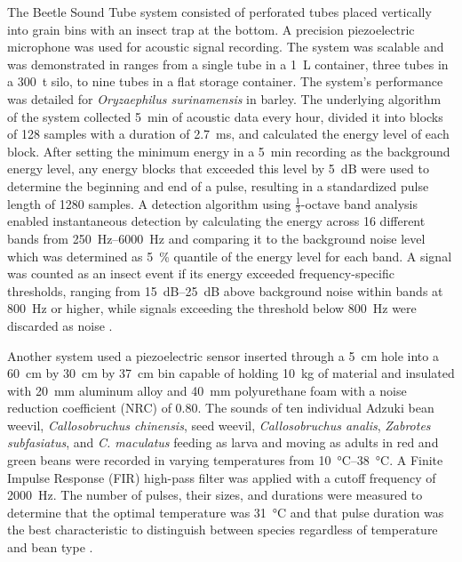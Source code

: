 \documentclass[../Vibro-Acoustic Signatures and Detection Algorithms for Stored Product Insects.tex]{subfiles}
\begin{document}
\newpage
The Beetle Sound Tube system consisted of perforated tubes placed vertically into grain bins with an insect trap at the bottom. A precision piezoelectric microphone was used for acoustic signal recording. The system was scalable and was demonstrated in ranges from a single tube in a \SI{1}{\liter} container, three tubes in a \SI{300}{\tonne} silo, to nine tubes in a flat storage container. The system's performance was detailed for \textit{Oryzaephilus surinamensis} in barley. The underlying algorithm of the system collected \SI{5}{\minute} of acoustic data every hour, divided it into blocks of 128 samples with a duration of \SI{2.7}{\milli\second}, and calculated the energy level of each block. After setting the minimum energy in a \SI{5}{\minute} recording as the background energy level, any energy blocks that exceeded this level by \SI{5}{\deci\bel} were used to determine the beginning and end of a pulse, resulting in a standardized pulse length of 1280 samples. A detection algorithm using $\frac{1}{3}$-octave band analysis enabled instantaneous detection by calculating the energy across 16 different bands from \SIrange{250}{6000}{\hertz} and comparing it to the background noise level which was determined as \SI{5}{\percent} quantile of the energy level for each band. A signal was counted as an insect event if its energy exceeded frequency-specific thresholds, ranging from \SIrange{15}{25}{\deci\bel} above background noise within bands at \SI{800}{\hertz} or higher, while signals exceeding the threshold below \SI{800}{\hertz} were discarded as noise \cite{muller-blenkleMethodAcousticStorage2023}.

Another system used a piezoelectric sensor inserted through a \SI{5}{\centi\meter} hole into a \SI{60}{\centi\meter} by \SI{30}{\centi\meter} by \SI{37}{\centi\meter} bin capable of holding \SI{10}{\kilo\gram} of material and insulated with \SI{20}{\milli\meter} aluminum alloy and \SI{40}{\milli\meter} polyurethane foam with a noise reduction coefficient (NRC) of 0.80. The sounds of ten individual Adzuki bean weevil, \textit{Callosobruchus chinensis}, seed weevil, \textit{Callosobruchus analis}, \textit{Zabrotes subfasiatus}, and \textit{C. maculatus} feeding as larva and moving as adults in red and green beans were recorded in varying temperatures from \SIrange{10}{38}{\celsius}. A Finite Impulse Response (FIR) high-pass filter was applied with a cutoff frequency of \SI{2000}{\hertz}. The number of pulses, their sizes, and durations were measured to determine that the optimal temperature was \SI{31}{\celsius} and that pulse duration was the best characteristic to distinguish between species regardless of temperature and bean type \cite{changBioacousticDetectionFour2025}.
\end{document}
